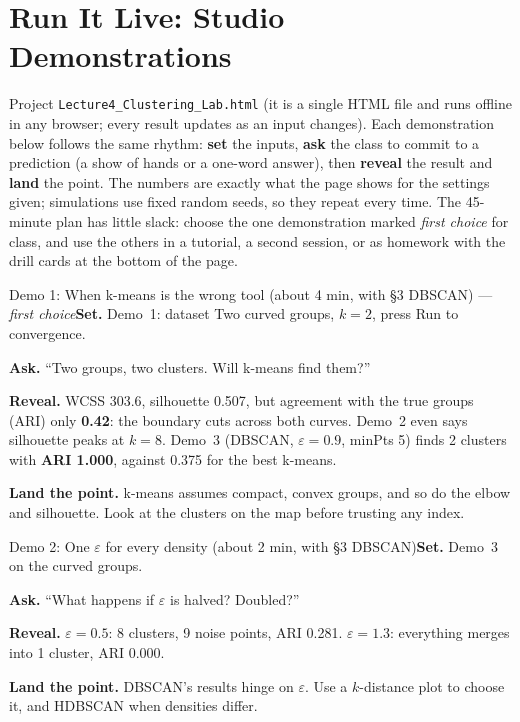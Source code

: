 \documentclass[11pt]{article}
\begin{document}
\section{Run It Live: Studio Demonstrations}\label{sec:live}

Project \texttt{Lecture4\_Clustering\_Lab.html} (it is a single HTML file and runs offline in any browser; every result updates as an input changes). Each demonstration below follows the same rhythm: \textbf{set} the inputs, \textbf{ask} the class to commit to a prediction (a show of hands or a one-word answer), then \textbf{reveal} the result and \textbf{land} the point. The numbers are exactly what the page shows for the settings given; simulations use fixed random seeds, so they repeat every time. The 45-minute plan has little slack: choose the one demonstration marked \emph{first choice} for class, and use the others in a tutorial, a second session, or as homework with the drill cards at the bottom of the page.

\begin{live}{Demo 1: When k-means is the wrong tool (about 4 min, with \S3 DBSCAN) --- \emph{first choice}}\textbf{Set.} Demo~1: dataset \textsf{Two curved groups}, $k=2$, press \textsf{Run to convergence}.\par\smallskip\textbf{Ask.} ``Two groups, two clusters. Will k-means find them?''\par\smallskip\textbf{Reveal.} WCSS 303.6, silhouette 0.507, but agreement with the true groups (ARI) only \textbf{0.42}: the boundary cuts across both curves. Demo~2 even says silhouette peaks at $k=8$. Demo~3 (DBSCAN, $\varepsilon=0.9$, minPts 5) finds 2 clusters with \textbf{ARI 1.000}, against 0.375 for the best k-means.\par\smallskip\textbf{Land the point.} k-means assumes compact, convex groups, and so do the elbow and silhouette. Look at the clusters on the map before trusting any index.\end{live}

\begin{live}{Demo 2: One $\varepsilon$ for every density (about 2 min, with \S3 DBSCAN)}\textbf{Set.} Demo~3 on the curved groups.\par\smallskip\textbf{Ask.} ``What happens if $\varepsilon$ is halved? Doubled?''\par\smallskip\textbf{Reveal.} $\varepsilon=0.5$: 8 clusters, 9 noise points, ARI 0.281. $\varepsilon=1.3$: everything merges into 1 cluster, ARI 0.000.\par\smallskip\textbf{Land the point.} DBSCAN's results hinge on $\varepsilon$. Use a $k$-distance plot to choose it, and HDBSCAN when densities differ.\end{live}
\end{document}
